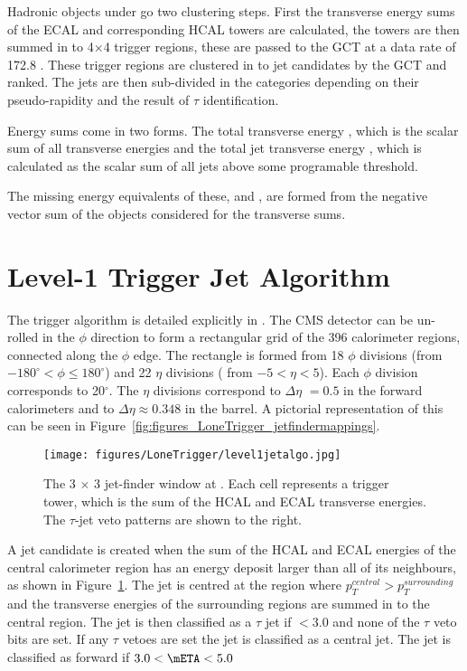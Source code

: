 Hadronic objects under go two clustering steps. First the transverse energy 
sums of the ECAL and corresponding HCAL towers are calculated, the towers are 
then summed in to 4$\times$4 trigger regions, these  are passed to the GCT at a 
data rate of 172.8 \Gbs. These trigger regions are clustered in to jet 
candidates by the GCT and ranked. The jets are then sub-divided in the 
categories depending on their pseudo-rapidity and the result of $\tau$ 
identification. 

Energy sums come in two forms. The total transverse energy \ET, which is the 
scalar sum of all transverse energies and the total jet transverse energy \HT,
which is calculated as the scalar sum of all jets above some programable 
threshold.

The missing energy equivalents of these, \MET and \MHT, are formed from the 
negative vector sum of the objects considered for the transverse sums.



\section{Level-1 Trigger Jet Algorithm} %
\label{sec:leve_1_trigger_jet_algorithm}
The \Lone trigger algorithm is detailed explicitly in \cite{gctcomm}.
The CMS detector can be un-rolled in the $\phi$ direction to form a rectangular 
grid of the 396 calorimeter regions, connected along the $\phi$ edge. The
rectangle is formed from 18 $\phi$ divisions (from $-180^{\circ} < \phi \leq 
180^{\circ}$) and 22 $\eta$ divisions ( from $-5 < \eta < 5$). Each $\phi$ 
division corresponds to 20$^{\circ}$. The $\eta$ divisions correspond to 
$\Delta\eta$ $= 0.5$ in the forward calorimeters and to $\Delta\eta \approx 
0.348$ in the barrel. A pictorial representation of this can be seen in 
Figure~\ref{fig:figures_LoneTrigger_jetfindermappings}.

\begin{figure}[ht]
  \centering
    \texttt{[image: figures/LoneTrigger/level1jetalgo.jpg]}
  \caption{The 3 $\times$ 3 jet-finder window at \Lone. Each cell represents a 
  trigger tower, which is the sum of the HCAL and ECAL transverse energies. The 
  $\tau$-jet veto patterns are shown to the right.}
  \label{fig:figures_LoneTrigger_level1jetalgo}
\end{figure}


A jet candidate is created when the sum of the HCAL and ECAL energies of the 
central calorimeter region has an energy deposit larger than all of its 
neighbours, as shown in Figure~\ref{fig:figures_LoneTrigger_level1jetalgo}.
The jet is centred at the region where $p_{T}^{central} > p_{T}^{surrounding}$
and the transverse energies of the surrounding regions are summed in to the 
central region. The jet is then classified as a $\tau$ jet if \mETA $< 3.0$ and 
none of the $\tau$ veto bits are set. If any $\tau$ vetoes are set the jet is 
classified as a central jet. The jet is classified as forward if $ 3.0 < \mETA 
< 5.0$

